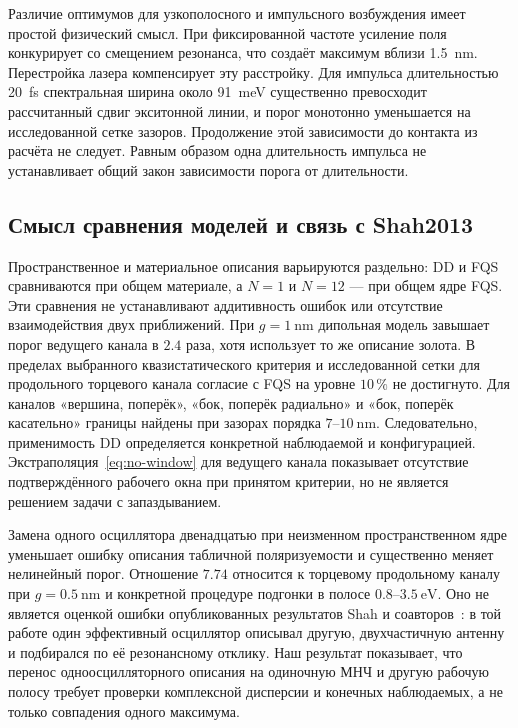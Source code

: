 Различие оптимумов для узкополосного и импульсного возбуждения имеет
простой физический смысл. При фиксированной частоте усиление поля
конкурирует со смещением резонанса, что создаёт максимум вблизи
\SI{1.5}{\nano\meter}. Перестройка лазера компенсирует эту расстройку.
Для импульса длительностью \SI{20}{\femto\second} спектральная ширина
около \SI{91}{\milli\electronvolt} существенно превосходит рассчитанный
сдвиг экситонной линии, и порог монотонно уменьшается на исследованной
сетке зазоров. Продолжение этой зависимости до контакта из расчёта
не следует. Равным образом одна длительность импульса не устанавливает
общий закон зависимости порога от длительности.

\subsection{Смысл сравнения моделей и связь с Shah2013}
\label{sec:disc-models}

Пространственное и материальное описания варьируются раздельно:
DD и FQS сравниваются при общем материале, а $N=1$ и $N=12$ ---
при общем ядре FQS. Эти сравнения не устанавливают аддитивность
ошибок или отсутствие взаимодействия двух приближений.
При $g=\SI{1}{\nano\meter}$ дипольная модель завышает порог ведущего
канала в $2.4$ раза, хотя использует то же описание золота.
В пределах выбранного квазистатического критерия и исследованной сетки
для продольного торцевого канала согласие с FQS на уровне $10\,\%$
не достигнуто. Для каналов «вершина, поперёк», «бок, поперёк радиально»
и «бок, поперёк касательно» границы найдены при зазорах порядка
$7$--$\SI{10}{\nano\meter}$. Следовательно, применимость DD определяется
конкретной наблюдаемой и конфигурацией. Экстраполяция~\eqref{eq:no-window}
для ведущего канала показывает отсутствие подтверждённого рабочего окна
при принятом критерии, но не является решением задачи с запаздыванием.

Замена одного осциллятора двенадцатью при неизменном пространственном
ядре уменьшает ошибку описания табличной поляризуемости и существенно
меняет нелинейный порог. Отношение $7.74$ относится к торцевому
продольному каналу при $g=\SI{0.5}{\nano\meter}$ и конкретной
процедуре подгонки в полосе
$0.8$--$\SI{3.5}{\electronvolt}$. Оно не является оценкой ошибки
опубликованных результатов Shah и соавторов~\cite{shah2013}:
в той работе один эффективный осциллятор описывал другую, двухчастичную
антенну и подбирался по её резонансному отклику. Наш результат показывает,
что перенос одноосцилляторного описания на одиночную МНЧ и другую
рабочую полосу требует проверки комплексной дисперсии и конечных
наблюдаемых, а не только совпадения одного максимума.

